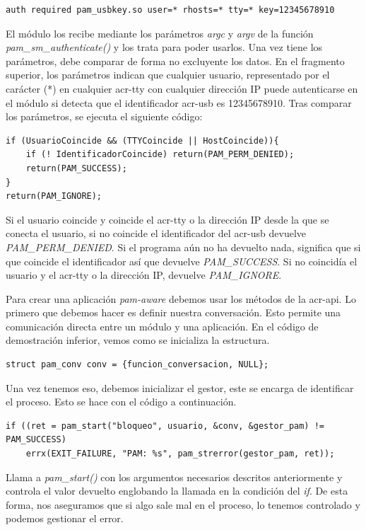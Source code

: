 \documentclass[titlepage, 12pt, a4paper]{article}
\begin{document}
{\begin{lstlisting}
auth required pam_usbkey.so user=* rhosts=* tty=* key=12345678910
\end{lstlisting}
El módulo los recibe mediante los parámetros \textit{argc} y \textit{argv} de la función \textit{pam\_sm\_authenticate()} y los trata para poder usarlos. Una vez tiene los parámetros, debe comparar de forma no excluyente los datos. En el fragmento superior, los parámetros indican que cualquier usuario, representado por el carácter (*) en cualquier \gls{acr-tty} con cualquier dirección IP puede autenticarse en el módulo si detecta que el identificador \gls{acr-usb} es 12345678910. Tras comparar los parámetros, se ejecuta el siguiente código:
\begin{lstlisting}[xleftmargin=.07\textwidth]
if (UsuarioCoincide && (TTYCoincide || HostCoincide)){
	if (! IdentificadorCoincide) return(PAM_PERM_DENIED);
	return(PAM_SUCCESS);
}
return(PAM_IGNORE);
\end{lstlisting}
Si el usuario coincide y coincide el \gls{acr-tty} o la dirección IP desde la que se conecta el usuario, si no coincide el identificador del \gls{acr-usb} devuelve \textit{PAM\_PERM\_DENIED}. Si el programa aún no ha devuelto nada, significa que si que coincide el identificador así que devuelve \textit{PAM\_SUCCESS}. Si no coincidía el usuario y el \gls{acr-tty} o la dirección IP, devuelve \textit{PAM\_IGNORE}.\par
Para crear una aplicación \textit{pam-aware} debemos usar los métodos de la \gls{acr-api}. Lo primero que debemos hacer es definir nuestra conversación. Esto permite una comunicación directa entre un módulo y una aplicación. En el código de demostración inferior, vemos como se inicializa la estructura.
\begin{lstlisting}[xleftmargin=.1\textwidth]
struct pam_conv conv = {funcion_conversacion, NULL};
\end{lstlisting}
Una vez tenemos eso, debemos inicializar el gestor, este se encarga de identificar el proceso. Esto se hace con el código a continuación.
\begin{lstlisting}[xleftmargin=0\textwidth]
if ((ret = pam_start("bloqueo", usuario, &conv, &gestor_pam) != PAM_SUCCESS)
	errx(EXIT_FAILURE, "PAM: %s", pam_strerror(gestor_pam, ret));
\end{lstlisting}
Llama a \textit{pam\_start()} con los argumentos necesarios descritos anteriormente y controla el valor devuelto englobando la llamada en la condición del \textit{if}. De esta forma, nos aseguramos que si algo sale mal en el proceso, lo tenemos controlado y podemos gestionar el error.\par
}
\end{document}
